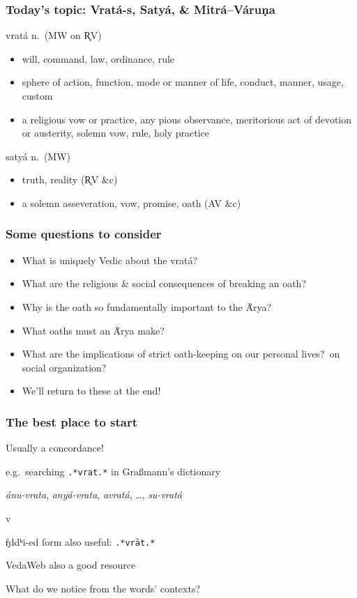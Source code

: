 \documentclass[pdf]{beamer}
\newcommand{\Subitem}[1]{{\setlength\itemindent{12pt} \item[-] #1}}
\begin{document}
\begin{frame} \frametitle{Today's topic: Vratá-s, Satyá, \& Mitrá--Váruṇa}
\begin{block} {vratá n.~(MW on R̥V)}
\begin{itemize}
	\item will, command, law, ordinance, rule
	\item sphere of action, function, mode or manner of life, conduct, manner, usage, custom
	\item a religious vow or practice, any pious observance, meritorious act of devotion or austerity, solemn vow, rule, holy practice
\end{itemize}
\end{block}
\pause
\begin{block} {satyá n.~(MW)}
\begin{itemize}
	\item truth, reality (R̥V \&c)
	\item a solemn asseveration, vow, promise, oath (AV \&c)
\end{itemize}
\end{block}
\end{frame}

\begin{frame}[label=questions] \frametitle{Some questions to consider}
\begin{itemize}
	\item What is uniquely Vedic about the vratá?
	\item What are the religious \& social consequences of breaking an oath?
	\item Why is the oath so fundamentally important to the Ā́rya?
	\item What oaths must an Ā́rya make?
	\item What are the implications of strict oath-keeping on our personal lives?~on social organization?
	\item We'll return to these at the end!
\end{itemize}
\end{frame}

\begin{frame} \frametitle{The best place to start}
\begin{itemize}
	\item Usually a concordance!
	\item e.g.~searching \texttt{.*vrat.*} in Graßmann's dictionary
	\Subitem {\textit{ánu-vrata}, \textit{anyá-vrata}, \textit{avratá}, \ldots, \textit{su-vratá}}
	\Subitem vŕ̥ddʰi-ed form also useful: \texttt{.*vrāt.*}
	\item VedaWeb also a good resource
	\item What do we notice from the words' contexts?
\end{itemize}
\end{frame}
\end{document}
